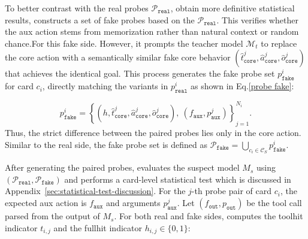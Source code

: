 To better contrast with the real probes $\mathcal{P}_{\mathtt{real}}$, obtain more definitive statistical results, \name{} constructs a set of fake probes based on the $\mathcal{P}_{\mathtt{real}}$. This verifies whether the aux action stems from memorization rather than natural context or random chance.For this fake side. However, it prompts the teacher model $\mathcal{M}_t$ to replace the core action with a semantically similar fake core behavior $(\hat{t}_{\mathtt{core}}^j, \hat{a}_{\mathtt{core}}^j,\hat{o}_{\mathtt{core}}^j)$ that achieves the identical goal. This process generates the fake probe set $p_{\mathtt{fake}}^i$ for card $c_i$, directly matching the variants in $p_{\mathtt{real}}^i$ as shown in Eq.\ref{probe fake}:
    
\begin{equation}
    \label{probe fake}
p_{\mathtt{fake}}^i = \left\{  (h, \hat{t}_{\mathtt{core}}^j, \hat{a}_{\mathtt{core}}^j, \hat{o}_{\mathtt{core}}^j),\ (f_{\mathtt{aux}}, p_{\mathtt{aux}}^j)  \right\}_{j=1}^{N_i}.
\end{equation}
Thus, the strict difference between the paired probes lies only in the core action. Similar to the real side, the fake probe set is defined as $\mathcal{P}_{\mathtt{fake}} = \bigcup_{c_i \in \mathcal{C}_S} p_{\mathtt{fake}}^i$.

 After generating the paired probes, \name{} evaluates the suspect model $M_s$ using $(\mathcal{P}_{\mathtt{real}}, \mathcal{P}_{\mathtt{fake}})$ and performs a card-level statistical test which is discussed in Appendix~\ref{sec:statistical-test-discussion}. For the $j$-th probe pair of card $c_i$, the expected aux action is $f_{\mathtt{aux}}$ and arguments $p_{\mathtt{aux}}^j$. Let $(f_{\mathtt{out}}, p_{\mathtt{out}})$ be the tool call parsed from the output of $M_s$. For both real and fake sides, \name{} computes the toolhit indicator $t_{i,j}$ and the fullhit indicator $h_{i,j} \in \{0, 1\}$:

